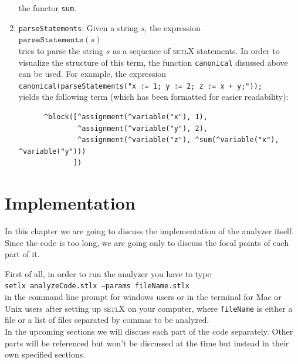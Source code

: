 \documentclass[11pt]{report}
\begin{document}
\begin{enumerate}
      the functor \texttt{sum}.
\item \texttt{parseStatements}:  Given a string $s$, the expression
      \\[0.2cm]
      \hspace*{1.3cm}
      $\mathtt{parseStatements}(s)$ 
      \\[0.2cm]
      tries to parse the string $s$ as a sequence of \textsc{setlX} statements.   In order to visualize the structure of
      this term,  the function \texttt{canonical} disussed above can be used.  For
      example, the expression
      \\[0.2cm]
      \hspace*{1.3cm}
      \texttt{canonical(parseStatements("x := 1; y := 2; z := x + y;"));}
      \\[0.2cm]
      yields the following term (which has been formatted for easier readability):
\begin{verbatim}
      ^block([^assignment(^variable("x"), 1), 
              ^assignment(^variable("y"), 2), 
              ^assignment(^variable("z"), ^sum(^variable("x"), ^variable("y")))
             ])
\end{verbatim}
\end{enumerate}

\chapter{Implementation}

In this chapter we are going to discuss the implementation of the analyzer itself. Since the code is too long, we are going only to discuss the focal points of each part of it.

First of all, in order to run the analyzer you have to type
\\[0.2cm]
\hspace*{1.3cm}
\texttt{setlx analyzeCode.stlx --params fileName.stlx}
\\[0.2cm]
in the command line prompt for windows users or in the terminal for Mac or Unix users after setting up \textsc{setlX} on your computer, where \texttt{fileName} is either a file or a list of files separated by commas to be analyzed.
\\

In the upcoming sections we will discuss each part of the code separately. Other parts will be referenced but won't be discussed at the time but instead in their own specified sections.
\end{document}
